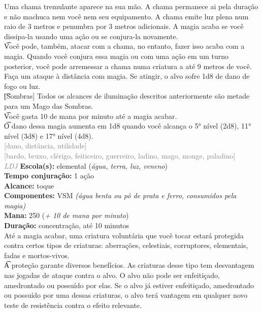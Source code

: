 \documentclass{RPG_Adventure}[2021/10/20]
\begin{document}
{\normalsize Uma chama tremulante aparece na sua mão. A chama permanece ai pela duração e não machuca nem você nem seu equipamento. A chama emite luz plena num raio de 3 metros e penumbra por 3 metros adicionais. A magia acaba se você dissipa-la usando uma ação ou se conjura-la novamente.\\\t Você pode, também, atacar com a chama, no entanto, fazer isso acaba com a magia. Quando você conjura essa magia ou com uma ação em um turno posterior, você pode arremessar a chama numa criatura a até 9 metros de você. Faça um ataque à distância com magia. Se atingir, o alvo sofre 1d8 de dano de fogo ou luz.\\\t [Sombras] Todos os alcances de iluminação descritos anteriormente são metade para um Mago das Sombras.\\\t Você gasta 10 de mana por minuto até a magia acabar.\\\t O dano dessa magia aumenta em 1d8 quando você alcança o 5° nível (2d8), 11° nível (3d8) e 17° nível (4d8).\\}
{\scriptsize \textcolor{gray}{[dano, distância, utilidade]\\}}
{\scriptsize \textcolor{gray}{[bardo, bruxo, clérigo, feiticeiro, guerreiro, ladino, mago, monge, paladino]\\}}
{\tiny \textcolor{gray}{\textit{LDJ}}}
{\small \t \textbf{Escola(s):} elemental (\textit{água, terra, luz, veneno})\\\t \textbf{Tempo conjuração:} 1 ação\\\t \textbf{Alcance:} toque\\\t \textbf{Componentes:} VSM \textit{(água benta ou pó de prata e ferro, consumidos pela magia)}\\\t \textbf{Mana:} 250 (\textit{+ 10 de mana por minuto})\\\t \textbf{Duração:} concentração, até 10 minutos\\}
{\normalsize Até a magia acabar, uma criatura voluntária que você tocar estará protegida contra certos tipos de criaturas: aberrações, celestiais, corruptores, elementais, fadas e mortos-vivos.\\\t A proteção garante diversos benefícios. As criaturas desse tipo tem desvantagem nas jogadas de ataque contra o alvo. O alvo não pode ser enfeitiçado, amedrontado ou possuído por elas. Se o alvo já estiver enfeitiçado, amedrontado ou possuído por uma dessas criaturas, o alvo terá vantagem em qualquer novo teste de resistência contra o efeito relevante.\\}
\end{document}
